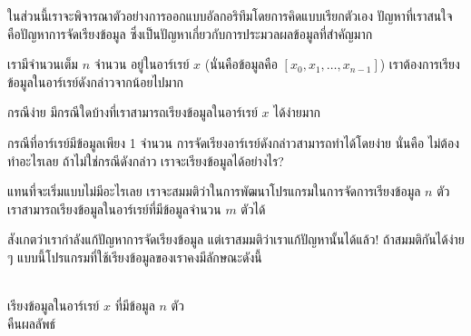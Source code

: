 ใน{\wbr}ส่วน{\wbr}นี้{\wbr}เรา{\wbr}จะ{\wbr}พิจารณา{\wbr}ตัวอย่าง{\wbr}การ{\wbr}ออกแบบ{\wbr}อัล{\wbr}กอ{\wbr}ริ{\wbr}ทึม{\wbr}โดย{\wbr}การ{\wbr}คิด{\wbr}แบบ{\wbr}เรียก{\wbr}ตัวเอง{\wbr}
ปัญหา{\wbr}ที่{\wbr}เรา{\wbr}สนใจ{\wbr}คือ{\wbr}ปัญหา{\wbr}การ{\wbr}จัดเรียง{\wbr}ข้อมูล ซึ่ง{\wbr}เป็น{\wbr}ปัญหา{\wbr}เกี่ยวกับ{\wbr}การ{\wbr}ประมวลผล{\wbr}ข้อมูล{\wbr}ที่{\wbr}สำคัญ{\wbr}มาก{\wbr}

เรา{\wbr}มี{\wbr}จำนวนเต็ม $n$ จำนวน อยู่{\wbr}ใน{\wbr}อาร์เรย์ $x$ (นั่น{\wbr}คือ{\wbr}ข้อมูล{\wbr}คือ{\wbr}
$[x_0,x_1,\ldots,x_{n-1}]$) เรา{\wbr}ต้องการ{\wbr}เรียง{\wbr}ข้อมูล{\wbr}ใน{\wbr}อาร์เรย์{\wbr}ดังกล่าว{\wbr}จาก{\wbr}น้อย{\wbr}ไป{\wbr}มาก{\wbr}

\begin{quiz}{กรณี{\wbr}ง่าย}
มี{\wbr}กรณี{\wbr}ใด{\wbr}บ้าง{\wbr}ที่{\wbr}เรา{\wbr}สามารถ{\wbr}เรียง{\wbr}ข้อมูล{\wbr}ใน{\wbr}อาร์เรย์ $x$ ได้{\wbr}ง่าย{\wbr}มาก{\wbr}
\end{quiz}

กรณี{\wbr}ที่{\wbr}อาร์เรย์{\wbr}มี{\wbr}ข้อมูล{\wbr}เพียง 1 จำนวน การ{\wbr}จัดเรียง{\wbr}อาร์เรย์{\wbr}ดังกล่าว{\wbr}สามารถ{\wbr}ทำ{\wbr}ได้{\wbr}โดย{\wbr}ง่าย นั่น{\wbr}คือ{\wbr}
ไม่{\wbr}ต้อง{\wbr}ทำ{\wbr}อะไร{\wbr}เลย  ถ้า{\wbr}ไม่{\wbr}ใช่{\wbr}กรณี{\wbr}ดังกล่าว เรา{\wbr}จะ{\wbr}เรียง{\wbr}ข้อมูล{\wbr}ได้{\wbr}อย่างไร?

แทน{\wbr}ที่{\wbr}จะ{\wbr}เริ่ม{\wbr}แบบ{\wbr}ไม่{\wbr}มี{\wbr}อะไร{\wbr}เลย เรา{\wbr}จะ{\wbr}สมมติ{\wbr}ว่า{\wbr}ใน{\wbr}การ{\wbr}พัฒนา{\wbr}โปรแกรม{\wbr}ใน{\wbr}การ{\wbr}จัดการ{\wbr}เรียง{\wbr}ข้อมูล{\wbr}
$n$ ตัว เรา{\wbr}สามารถ{\wbr}เรียง{\wbr}ข้อมูล{\wbr}ใน{\wbr}อาร์เรย์{\wbr}ที่{\wbr}มี{\wbr}ข้อมูล{\wbr}จำนวน $m$ ตัว{\wbr}ได้{\wbr}

สังเกต{\wbr}ว่า{\wbr}เรา{\wbr}กำลัง{\wbr}แก้{\wbr}ปัญหา{\wbr}การ{\wbr}จัดเรียง{\wbr}ข้อมูล แต่{\wbr}เรา{\wbr}สมมติ{\wbr}ว่า{\wbr}เรา{\wbr}แก้{\wbr}ปัญหา{\wbr}นั้น{\wbr}ได้{\wbr}แล้ว!
ถ้า{\wbr}สมมติ{\wbr}กัน{\wbr}ได้{\wbr}ง่าย ๆ แบบ{\wbr}นี้{\wbr}โปรแกรม{\wbr}ที่{\wbr}ใช้{\wbr}เรียง{\wbr}ข้อมูล{\wbr}ของ{\wbr}เรา{\wbr}คง{\wbr}มี{\wbr}ลักษณะ{\wbr}ดังนี้{\wbr}

\begin{algt}
\\
\hspace*{0.2in} เรียง{\wbr}ข้อมูล{\wbr}ใน{\wbr}อาร์เรย์ $x$ ที่{\wbr}มี{\wbr}ข้อมูล $n$ ตัว\\
\hspace*{0.2in} คืน{\wbr}ผลลัพธ์{\wbr}
\end{algt}

